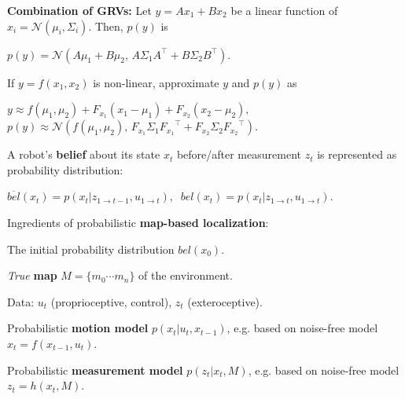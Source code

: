 \documentclass[landscape]{article}
\newcommand{\vmspace}{\vspace{-7pt}}
\newcommand{\vpspace}{\vspace{5pt}}
\begin{document}
\begin{multicols}{3}
\begin{minipage}{\columnwidth}
  \textbf{Combination of GRVs:} Let $y=Ax_1 + Bx_2$ be a linear function of
  $x_i=\mathcal N(\mu_i, \Sigma_i)$. Then, $p(y)$ is
  \vmspace
  \begin{center}
    $
    p(y) = \mathcal N (A\mu_1 + B\mu_2,\,
    A\Sigma_1A^\intercal + B\Sigma_2B^\intercal).
    $
  \end{center}
  \vmspace
  If $y=f(x_1,x_2)$ is non-linear, approximate $y$ and $p(y)$ as
  \vmspace
  \begin{center}
    $
    y \approx f(\mu_1, \mu_2) + F_{x_1} (x_1 - \mu_1) + F_{x_2}(x_2 -
    \mu_2),\;\;$\\
    $p(y) \approx \mathcal N(f(\mu_1, \mu_2),\,
    F_{x_1}\Sigma_1{F_{x_1}}^\intercal +
    F_{x_2}\Sigma_2{F_{x_2}}^\intercal).
    $
  \end{center}
\end{minipage}

\vpspace

\begin{minipage}{\columnwidth}
  A robot's \textbf{belief} about its state $x_t$ before/after measurement $z_t$
  is represented as probability distribution:
  \vmspace
  \begin{center}
    $
    \overline{bel}(x_t)
    =
    p(x_t | z_{1 \rightarrow t-1}, u_{1 \rightarrow t}),\;\;
    bel(x_t)
    =
    p(x_t | z_{1 \rightarrow t}, u_{1 \rightarrow t}).
    $
  \end{center}
\end{minipage}

\vpspace

\begin{minipage}{\columnwidth}
  Ingredients of probabilistic \textbf{map-based localization}:
  \begin{compactenum}
  \item The initial probability distribution $bel(x_0)$.
  \item \textit{True} \textbf{map} $M = \{m_0\cdots m_n\}$ of the environment.
  \item Data: $u_t$ (proprioceptive, control), $z_t$ (exteroceptive).
  \item Probabilistic \textbf{motion model} $p(x_t|u_t, x_{t-1})$, e.g. based on
    noise-free model $x_t = f(x_{t-1}, u_t)$.
  \item Probabilistic \textbf{measurement model} $p(z_t|x_t,M)$, e.g. based on
    noise-free model $z_t = h(x_t, M)$.
  \end{compactenum}
\end{minipage}


\end{multicols}
\end{document}
